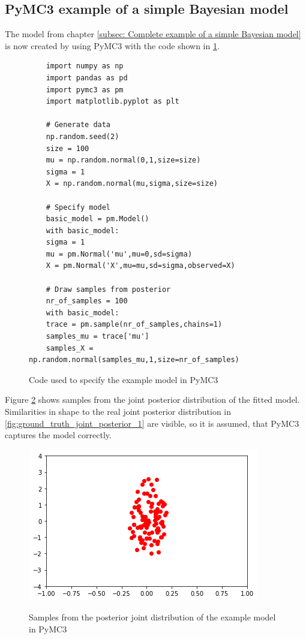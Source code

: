 \documentclass{article}
\begin{document}
\subsection{PyMC3 example of a simple Bayesian model}
\label{subsec: PyMC3 example of a simple Bayesian model}
The model from chapter \autoref{subsec: Complete example of a simple Bayesian model} is now created by using PyMC3 with the code shown in \ref{fig:PyMC3_example_code_simple_model}.
\begin{figure}[h]
	\begin{lstlisting}
	import numpy as np
	import pandas as pd
	import pymc3 as pm
	import matplotlib.pyplot as plt
	
	# Generate data
	np.random.seed(2)
	size = 100
	mu = np.random.normal(0,1,size=size)
	sigma = 1
	X = np.random.normal(mu,sigma,size=size)

	# Specify model
	basic_model = pm.Model()
	with basic_model:
	sigma = 1
	mu = pm.Normal('mu',mu=0,sd=sigma)
	X = pm.Normal('X',mu=mu,sd=sigma,observed=X)

	# Draw samples from posterior
	nr_of_samples = 100
	with basic_model:
	trace = pm.sample(nr_of_samples,chains=1)
	samples_mu = trace['mu']
	samples_X = np.random.normal(samples_mu,1,size=nr_of_samples)
	\end{lstlisting}
	\label{fig:PyMC3_example_code_simple_model}
	\caption[Code used to specify the example model in PyMC3]{Code used to specify the example model in PyMC3}
\end{figure}
Figure \ref{fig:PyMC3_joint_posterior_samples_simple_model} shows samples from the joint posterior distribution of the fitted model. Similarities in shape to the real joint posterior distribution in \ref{fig:ground_truth_joint_posterior_1} are visible, so it is assumed, that PyMC3 captures the model correctly.
\begin{figure}
	\includegraphics[width=\textwidth]{images/PyMC3_joint_posterior_samples_simple_model.png}
	\label{fig:PyMC3_joint_posterior_samples_simple_model}
	\caption[Samples from the posterior joint distribution of the example model in PyMC3]{Samples from the posterior joint distribution of the example model in PyMC3}
\end{figure}
\end{document}
